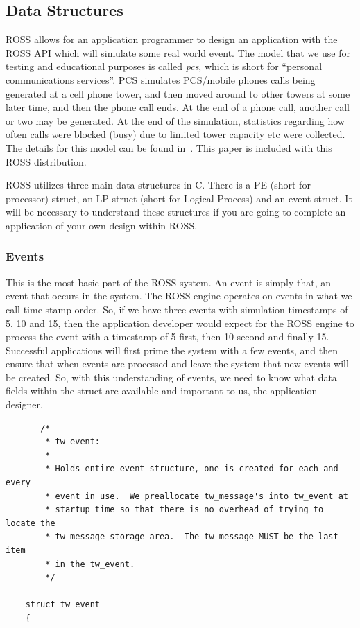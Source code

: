 \documentclass[12pt]{article}
\begin{document}
\subsection{Data Structures}
ROSS allows for an application programmer to design an application with the
ROSS API which will simulate some real world event.  The model that we use for
testing and educational purposes is called {\em pcs}, which is short for
``personal communications services''.  PCS simulates PCS/mobile phones calls
being generated at a cell phone tower, and then moved around to other towers
at some later time, and then the phone call ends.  At the end of a phone call,
another call or two may be generated.  At the end of the simulation,
statistics regarding how often calls were blocked (busy) due to limited tower
capacity etc were collected. The details for this model can be found
in~\cite{carothers-pads-1995}. This paper is included with this ROSS
distribution.

ROSS utilizes three main data structures in C.  There is a PE (short for
processor) struct, an LP struct (short for Logical Process) and an event
struct.  It will be necessary to understand these structures if you are going
to complete an application of your own design within ROSS.
 
\subsubsection{Events}
This is the most basic part of the ROSS system.  An event is simply that, an
event that occurs in the system.  The ROSS engine operates on events in what
we call time-stamp order.  So, if we have three events with simulation
timestamps of 5, 10 and 15, then the application developer would expect for
the ROSS engine to process the event with a timestamp of 5 first, then 10
second and finally 15.  Successful applications will first prime the system
with a few events, and then ensure that when events are processed and leave
the system that new events will be created.  So, with this understanding of
events, we need to know what data fields within the struct are available and
important to us, the application designer.

\begin{verbatim}
       /*
        * tw_event:
        *
        * Holds entire event structure, one is created for each and every
        * event in use.  We preallocate tw_message's into tw_event at
        * startup time so that there is no overhead of trying to locate the
        * tw_message storage area.  The tw_message MUST be the last item
        * in the tw_event.
        */

	struct tw_event
	{
\end{verbatim}
\end{document}
